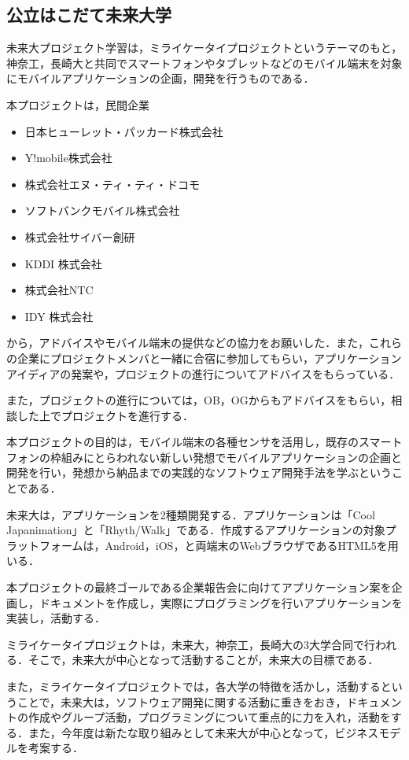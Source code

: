 \subsection{公立はこだて未来大学}
\par
未来大プロジェクト学習は，ミライケータイプロジェクトというテーマのもと，神奈工，長崎大と共同でスマートフォンやタブレットなどのモバイル端末を対象にモバイルアプリケーションの企画，開発を行うものである．
\par
本プロジェクトは，民間企業
\begin{itemize}
\item 日本ヒューレット・パッカード株式会社
\item Y!mobile株式会社
\item 株式会社エヌ・ティ・ティ・ドコモ
\item ソフトバンクモバイル株式会社
\item 株式会社サイバー創研
\item KDDI 株式会社
\item 株式会社NTC
\item IDY 株式会社
\end{itemize}
から，アドバイスやモバイル端末の提供などの協力をお願いした．また，これらの企業にプロジェクトメンバと一緒に合宿に参加してもらい，アプリケーションアイディアの発案や，プロジェクトの進行についてアドバイスをもらっている．
\par
また，プロジェクトの進行については，OB，OGからもアドバイスをもらい，相談した上でプロジェクトを進行する．
\par
本プロジェクトの目的は，モバイル端末の各種センサを活用し，既存のスマートフォンの枠組みにとらわれない新しい発想でモバイルアプリケーションの企画と開発を行い，発想から納品までの実践的なソフトウェア開発手法を学ぶということである．
\par
未来大は，アプリケーションを2種類開発する．アプリケーションは「Cool Japanimation」と「Rhyth/Walk」である．作成するアプリケーションの対象プラットフォームは，Android，iOS，と両端末のWebブラウザであるHTML5を用いる．
\par
本プロジェクトの最終ゴールである企業報告会に向けてアプリケーション案を企画し，ドキュメントを作成し，実際にプログラミングを行いアプリケーションを実装し，活動する．
\par
ミライケータイプロジェクトは，未来大，神奈工，長崎大の3大学合同で行われる．そこで，未来大が中心となって活動することが，未来大の目標である．
\par
また，ミライケータイプロジェクトでは，各大学の特徴を活かし，活動するということで，未来大は，ソフトウェア開発に関する活動に重きをおき，ドキュメントの作成やグループ活動，プログラミングについて重点的に力を入れ，活動をする．また，今年度は新たな取り組みとして未来大が中心となって，ビジネスモデルを考案する．
